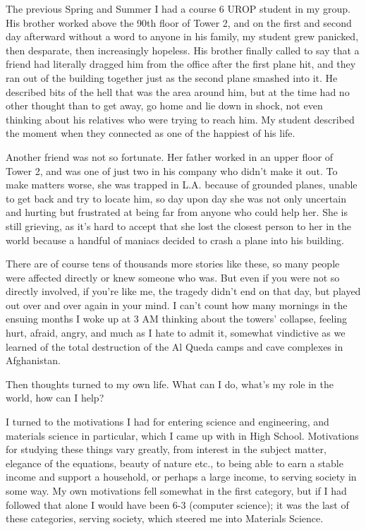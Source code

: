 \documentclass{report}
\begin{document}
The previous Spring and Summer I had a course 6 UROP student in my group.  His
brother worked above the 90th floor of Tower 2, and on the first and second day
afterward without a word to anyone in his family, my student grew panicked,
then desparate, then increasingly hopeless.  His brother finally called to say
that a friend had literally dragged him from the office after the first plane
hit, and they ran out of the building together just as the second plane smashed
into it.  He described bits of the hell that was the area around him, but at
the time had no other thought than to get away, go home and lie down in shock,
not even thinking about his relatives who were trying to reach him.  My student
described the moment when they connected as one of the happiest of his life.

Another friend was not so fortunate.  Her father worked in an upper floor of
Tower 2, and was one of just two in his company who didn't make it out.  To
make matters worse, she was trapped in L.A. because of grounded planes, unable
to get back and try to locate him, so day upon day she was not only uncertain
and hurting but frustrated at being far from anyone who could help her.  She is
still grieving, as it's hard to accept that she lost the closest person to her
in the world because a handful of maniacs decided to crash a plane into his
building.

There are of course tens of thousands more stories like these, so many people
were affected directly or knew someone who was.  But even if you were not so
directly involved, if you're like me, the tragedy didn't end on that day, but
played out over and over again in your mind.  I can't count how many mornings
in the ensuing months I woke up at 3 AM thinking about the towers' collapse,
feeling hurt, afraid, angry, and much as I hate to admit it, somewhat
vindictive as we learned of the total destruction of the Al Queda camps and
cave complexes in Afghanistan.

Then thoughts turned to my own life.  What can I do, what's my role in the
world, how can I help?

I turned to the motivations I had for entering science and engineering, and
materials science in particular, which I came up with in High School.
Motivations for studying these things vary greatly, from interest in the
subject matter, elegance of the equations, beauty of nature etc., to being able
to earn a stable income and support a household, or perhaps a large income, to
serving society in some way.  My own motivations fell somewhat in the first
category, but if I had followed that alone I would have been 6-3 (computer
science); it was the last of these categories, serving society, which steered
me into Materials Science.
\end{document}
